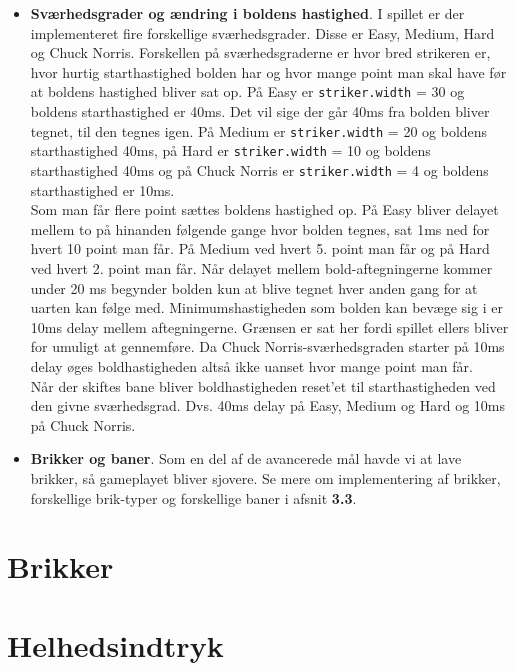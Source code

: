 \begin{itemize}
\item \textbf{Sværhedsgrader og ændring i boldens hastighed}. I spillet er der implementeret fire forskellige sværhedsgrader. Disse er Easy, Medium, Hard og Chuck Norris. Forskellen på sværhedsgraderne er hvor bred strikeren er, hvor hurtig starthastighed bolden har og hvor mange point man skal have før at boldens hastighed bliver sat op. På Easy er \texttt{striker.width} = 30 og boldens starthastighed er 40ms. Det vil sige der går 40ms fra bolden bliver tegnet, til den tegnes igen. På Medium er \texttt{striker.width} = 20 og boldens starthastighed 40ms, på Hard er \texttt{striker.width} = 10 og boldens starthastighed 40ms og på Chuck Norris er \texttt{striker.width} = 4 og boldens starthastighed er 10ms.\\

Som man får flere point sættes boldens hastighed op. På Easy bliver delayet mellem to på hinanden følgende gange hvor bolden tegnes, sat 1ms ned for hvert 10 point man får. På Medium ved hvert 5. point man får og på Hard ved hvert 2. point man får. Når delayet mellem bold-aftegningerne kommer under 20 ms begynder bolden kun at blive tegnet hver anden gang for at uarten kan følge med. Minimumshastigheden som bolden kan bevæge sig i er 10ms delay mellem aftegningerne. Grænsen er sat her fordi spillet ellers bliver for umuligt at gennemføre. Da Chuck Norris-sværhedsgraden starter på 10ms delay øges boldhastigheden altså ikke uanset hvor mange point man får.\\
Når der skiftes bane bliver boldhastigheden reset'et til starthastigheden ved den givne sværhedsgrad. Dvs. 40ms delay på Easy, Medium og Hard og 10ms på Chuck Norris.

\item \textbf{Brikker og baner}. Som en del af de avancerede mål havde vi at lave brikker, så gameplayet bliver sjovere. Se mere om implementering af brikker, forskellige brik-typer og forskellige baner i afsnit \textbf{3.3}.

\end{itemize}


\section{Brikker}
		

\section{Helhedsindtryk}

